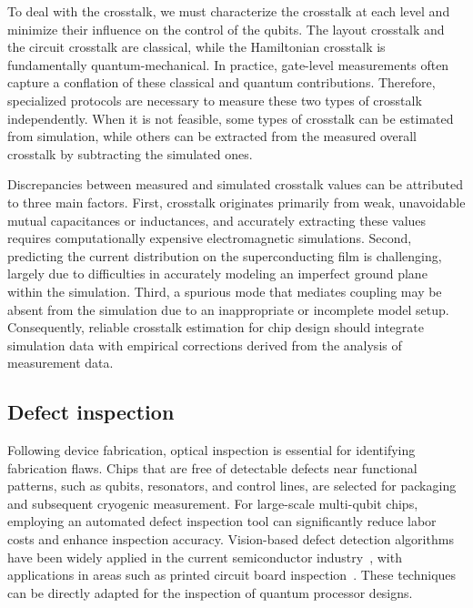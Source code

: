 \documentclass[a4paper,onecolumn,11pt,unpublished]{quantumarticle}
\begin{document}
To deal with the crosstalk, we must characterize the crosstalk at each level and minimize their influence on the control of the qubits. The layout crosstalk and the circuit crosstalk are classical, while the Hamiltonian crosstalk is fundamentally quantum-mechanical. In practice, gate-level measurements often capture a conflation of these classical and quantum contributions. Therefore, specialized protocols are necessary to measure these two types of crosstalk independently. When it is not feasible, some types of crosstalk can be estimated from simulation, while others can be extracted from the measured overall crosstalk by subtracting the simulated ones.

Discrepancies between measured and simulated crosstalk values can be attributed to three main factors. First, crosstalk originates primarily from weak, unavoidable mutual capacitances or inductances, and accurately extracting these values requires computationally expensive electromagnetic simulations. Second, predicting the current distribution on the superconducting film is challenging, largely due to difficulties in accurately modeling an imperfect ground plane within the simulation. Third, a spurious mode that mediates coupling may be absent from the simulation due to an inappropriate or incomplete model setup. Consequently, reliable crosstalk estimation for chip design should integrate simulation data with empirical corrections derived from the analysis of measurement data.

\subsection{Defect inspection}
Following device fabrication, optical inspection is essential for identifying fabrication flaws. Chips that are free of detectable defects near functional patterns, such as qubits, resonators, and control lines, are selected for packaging and subsequent cryogenic measurement. For large-scale multi-qubit chips, employing an automated defect inspection tool can significantly
reduce labor costs and enhance inspection accuracy. Vision-based defect detection algorithms have been widely applied in the current semiconductor industry~\cite{Czimmermann2020VisualBased}, with applications in areas such as printed circuit board inspection~\cite{Zhou2023Review}. These techniques can be directly adapted for the inspection of quantum processor designs.
\end{document}
